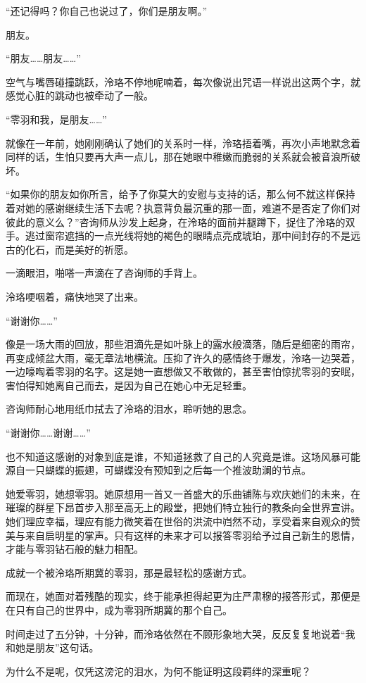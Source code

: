 \documentclass[UTF8, scheme = chinese, openany]{ctexbook}
\begin{document}
“还记得吗？你自己也说过了，你们是朋友啊。”

朋友。

“朋友……朋友……”

空气与嘴唇碰撞跳跃，泠珞不停地呢喃着，每次像说出咒语一样说出这两个字，就感觉心脏的跳动也被牵动了一般。

“零羽和我，是朋友……”

就像在一年前，她刚刚确认了她们的关系时一样，泠珞捂着嘴，再次小声地默念着同样的话，生怕只要再大声一点儿，那在她眼中稚嫩而脆弱的关系就会被音浪所破坏。

“如果你的朋友如你所言，给予了你莫大的安慰与支持的话，那么何不就这样保持着对她的感谢继续生活下去呢？执意背负最沉重的那一面，难道不是否定了你们对彼此的意义么？”咨询师从沙发上起身，在泠珞的面前并腿蹲下，捉住了泠珞的双手。逃过窗帘遮挡的一点光线将她的褐色的眼睛点亮成琥珀，那中间封存的不是远古的化石，而是美好的祈愿。

一滴眼泪，啪嗒一声滴在了咨询师的手背上。

泠珞哽咽着，痛快地哭了出来。

“谢谢你……”

像是一场大雨的回放，那些泪滴先是如叶脉上的露水般滴落，随后是细密的雨帘，再变成倾盆大雨，毫无章法地横流。压抑了许久的感情终于爆发，泠珞一边哭着，一边嚎啕着零羽的名字。这是她一直想做又不敢做的，甚至害怕惊扰零羽的安眠，害怕得知她离自己而去，是因为自己在她心中无足轻重。

咨询师耐心地用纸巾拭去了泠珞的泪水，聆听她的思念。

“谢谢你……谢谢……”

也不知道这感谢的对象到底是谁，不知道拯救了自己的人究竟是谁。这场风暴可能源自一只蝴蝶的振翅，可蝴蝶没有预知到之后每一个推波助澜的节点。

她爱零羽，她想零羽。她原想用一首又一首盛大的乐曲铺陈与欢庆她们的未来，在璀璨的群星下昂首步入那至高无上的殿堂，把她们特立独行的教条向全世界宣讲。她们理应幸福，理应有能力微笑着在世俗的洪流中岿然不动，享受着来自观众的赞美与来自启明星的掌声。只有这样的未来才可以报答零羽给予过自己新生的恩情，才能与零羽钻石般的魅力相配。

成就一个被泠珞所期冀的零羽，那是最轻松的感谢方式。

而现在，她面对着残酷的现实，终于能承担得起更为庄严肃穆的报答形式，那便是在只有自己的世界中，成为零羽所期冀的那个自己。

时间走过了五分钟，十分钟，而泠珞依然在不顾形象地大哭，反反复复地说着“我和她是朋友”这句话。

为什么不是呢，仅凭这滂沱的泪水，为何不能证明这段羁绊的深重呢？
\end{document}
